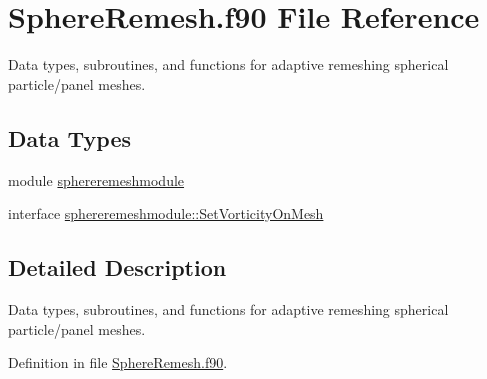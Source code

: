 \hypertarget{_sphere_remesh_8f90}{\section{Sphere\+Remesh.\+f90 File Reference}
\label{_sphere_remesh_8f90}
}


Data types, subroutines, and functions for adaptive remeshing spherical particle/panel meshes.  


\subsection*{Data Types}
\begin{DoxyCompactItemize}
\item 
module \hyperlink{classsphereremeshmodule}{sphereremeshmodule}
\item 
interface \hyperlink{interfacesphereremeshmodule_1_1_set_vorticity_on_mesh}{sphereremeshmodule\+::\+Set\+Vorticity\+On\+Mesh}
\end{DoxyCompactItemize}


\subsection{Detailed Description}
Data types, subroutines, and functions for adaptive remeshing spherical particle/panel meshes. 



Definition in file \hyperlink{_sphere_remesh_8f90_source}{Sphere\+Remesh.\+f90}.

